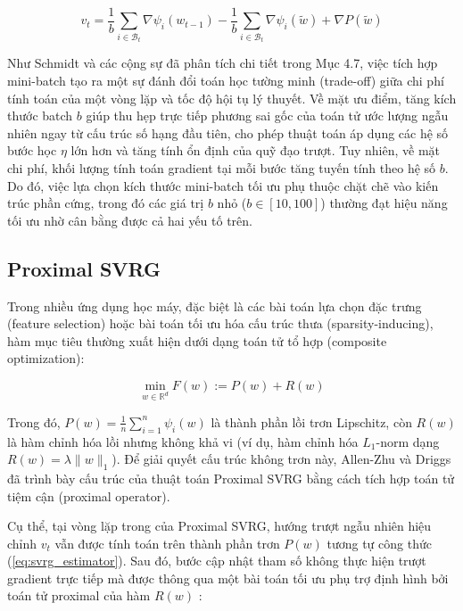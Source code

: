 \begin{equation}
v_t = \frac{1}{b} \sum_{i \in \mathcal{B}_t} \nabla \psi_i(w_{t-1}) - \frac{1}{b} \sum_{i \in \mathcal{B}_t} \nabla \psi_i(\tilde{w}) + \nabla P(\tilde{w})
\end{equation}

Như Schmidt và các cộng sự \cite{schmidt2017minimizing} đã phân tích chi tiết trong Mục 4.7, việc tích hợp mini-batch tạo ra một sự đánh đổi toán học tường minh (trade-off) giữa chi phí tính toán của một vòng lặp và tốc độ hội tụ lý thuyết. Về mặt ưu điểm, tăng kích thước batch $b$ giúp thu hẹp trực tiếp phương sai gốc của toán tử ước lượng ngẫu nhiên ngay từ cấu trúc số hạng đầu tiên, cho phép thuật toán áp dụng các hệ số bước học $\eta$ lớn hơn và tăng tính ổn định của quỹ đạo trượt. Tuy nhiên, về mặt chi phí, khối lượng tính toán gradient tại mỗi bước tăng tuyến tính theo hệ số $b$. Do đó, việc lựa chọn kích thước mini-batch tối ưu phụ thuộc chặt chẽ vào kiến trúc phần cứng, trong đó các giá trị $b$ nhỏ ($b \in [10, 100]$) thường đạt hiệu năng tối ưu nhờ cân bằng được cả hai yếu tố trên.



\subsection{Proximal SVRG}

Trong nhiều ứng dụng học máy, đặc biệt là các bài toán lựa chọn đặc trưng (feature selection) hoặc bài toán tối ưu hóa cấu trúc thưa (sparsity-inducing), hàm mục tiêu thường xuất hiện dưới dạng toán tử tổ hợp (composite optimization):

\begin{equation}
\min_{w \in \mathbb{R}^d} F(w) := P(w) + R(w)
\end{equation}

Trong đó, $P(w) = \frac{1}{n} \sum_{i=1}^n \psi_i(w)$ là thành phần lồi trơn Lipschitz, còn $R(w)$ là hàm chỉnh hóa lồi nhưng không khả vi (ví dụ, hàm chỉnh hóa $L_1$-norm dạng $R(w) = \lambda \|w\|_1$). Để giải quyết cấu trúc không trơn này, Allen-Zhu \cite{allen2017katyusha} và Driggs \cite{driggs2022accelerating} đã trình bày cấu trúc của thuật toán Proximal SVRG bằng cách tích hợp toán tử tiệm cận (proximal operator).



Cụ thể, tại vòng lặp trong của Proximal SVRG, hướng trượt ngẫu nhiên hiệu chỉnh $v_t$ vẫn được tính toán trên thành phần trơn $P(w)$ tương tự công thức (\ref{eq:svrg_estimator}). Sau đó, bước cập nhật tham số không thực hiện trượt gradient trực tiếp mà được thông qua một bài toán tối ưu phụ trợ định hình bởi toán tử proximal của hàm $R(w)$ \cite{allen2017katyusha}:

